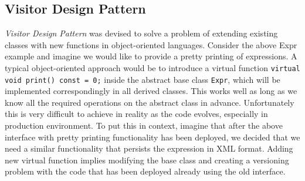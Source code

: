 \documentclass[preprint]{sigplanconf}
\DeclareRobustCommand{\code}[1]{{\lstinline[breaklines=false]{#1}}}
\begin{document}

\subsection{Visitor Design Pattern}



\emph{Visitor Design Pattern}\cite{DesignPatterns1993} was devised to solve a problem 
of extending existing classes with new functions in object-oriented languages. 
Consider the above Expr example and imagine we would like to provide a pretty 
printing of expressions. A typical object-oriented approach would be to 
introduce a virtual function \code{virtual void print() const = 0;} inside the 
abstract base class \code{Expr}, which will be implemented correspondingly in all derived 
classes. This works well as long as we know all the required operations on the 
abstract class in advance. Unfortunately this is very difficult to achieve in 
reality as the code evolves, especially in production environment. To put this 
in context, imagine that after the above interface with pretty printing 
functionality has been deployed, we decided that we need a similar functionality 
that persists the expression in XML format. Adding new virtual function implies 
modifying the base class and creating a versioning problem with the code that 
has been deployed already using the old interface.
\end{document}
